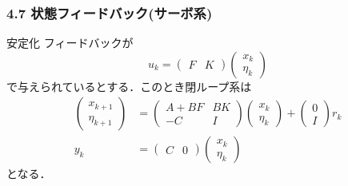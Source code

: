 \begin{frame}[t]
\frametitle{4.7 状態フィードバック(サーボ系)}
安定化
フィードバックが
\begin{equation}
 u_k = \left(\begin{array}{cc}
	      F & K 
	     \end{array}\right)
 \left(\begin{array}{c}
        x_k \\
	\eta_k
       \end{array}\right)
\end{equation}
で与えられているとする．このとき閉ループ系は
\begin{align}
 \left(\begin{array}{c}
	x_{k+1} \\
	\eta_{k+1}
       \end{array}\right)
 &=
 \left(\begin{array}{cc}
        A + B F & B K  \\
	-C      & I
       \end{array}\right)
 \left(\begin{array}{c}
        x_k \\
	\eta_k
       \end{array}\right)
 +
 \left(\begin{array}{c}
        0 \\
	I
       \end{array}\right) 
 r_k \\
 y_k &=
  \left(\begin{array}{cc}
         C & 0 
	\end{array}\right)
  \left(\begin{array}{c}
         x_k \\
	 \eta_k
	\end{array}\right)
\end{align}
となる．
\end{frame}

